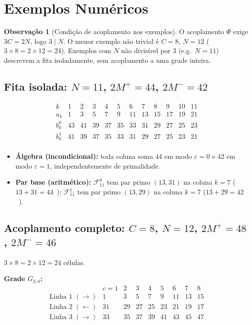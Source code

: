 \documentclass[12pt, a4paper]{article}
\theoremstyle{plain}
\theoremstyle{definition}
\newtheorem{remark}[theorem]{Observação}
\theoremstyle{remark}
\begin{document}
	\section{Exemplos Numéricos}
	\label{sec:exemplos}
	
	\begin{remark}[Condição de acoplamento nos exemplos]
		O acoplamento $\Phi$ exige $3C=2N$, logo $3\mid N$.  O menor
		exemplo não trivial é $C=8$, $N=12$
		($3\times8=2\times12=24$).  Exemplos com $N$ não divisível por
		$3$ (e.g.\ $N=11$) descrevem a fita isoladamente, sem acoplamento
		a uma grade inteira.
	\end{remark}
	
	\subsection{Fita isolada: $N=11$, $2M^+=44$, $2M^-=42$}
	
	\[
	\begin{array}{c|ccccccccccc}
		k    & 1 & 2 & 3 & 4 & 5 & 6 & 7 & 8 & 9 & 10 & 11\\
		\hline
		a_k  & 1 & 3 & 5 & 7 & 9 &11 &13 &15 &17 &19  &21 \\
		b_k^0& 43&41 &39 &37 &35 &33 &31 &29 &27 &25  &23 \\
		b_k^1& 41&39 &37 &35 &33 &31 &29 &27 &25 &23  &21 \\
	\end{array}
	\]
	
	\begin{itemize}
		\item \textbf{Álgebra (incondicional):} toda coluna soma $44$
		em modo $\varepsilon=0$ e $42$ em modo $\varepsilon=1$,
		independentemente de primalidade.
		\item \textbf{Par base (aritmético):}
		$\mathcal{F}_{11}^0$ tem par primo $(13,31)$ na coluna
		$k=7$ ($13+31=44$~\checkmark);
		$\mathcal{F}_{11}^1$ tem par primo $(13,29)$ na coluna
		$k=7$ ($13+29=42$~\checkmark).
	\end{itemize}
	
	\subsection{Acoplamento completo: $C=8$, $N=12$, $2M^+=48$,
		$2M^-=46$}
	
	$3\times8=2\times12=24$ células. \checkmark
	
	\medskip\noindent\textbf{Grade $G_{3,8}$:}
	\[
	\begin{array}{c|cccccccc}
		& c=1&2&3&4&5&6&7&8\\
		\hline
		\text{Linha~1 }(\rightarrow) & 1&3&5&7&9&11&13&15\\
		\text{Linha~2 }(\leftarrow)  &31&29&27&25&23&21&19&17\\
		\text{Linha~3 }(\rightarrow) &33&35&37&39&41&43&45&47\\
	\end{array}
	\]
	
\end{document}
